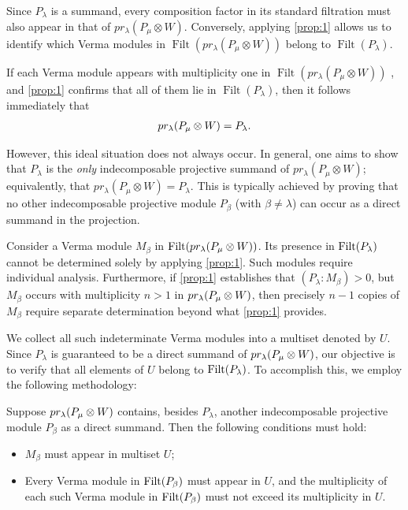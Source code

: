 Since  $P_\lambda$  is a summand, every composition factor in its standard filtration must also appear in that of $pr_\lambda(P_\mu \otimes W)$. Conversely, applying \cref{prop:1} allows us to identify which Verma modules in $\operatorname{Filt}(pr_\lambda(P_\mu \otimes W))$ belong to  $\operatorname{Filt}(P_\lambda)$.

If each Verma module appears with multiplicity one in $\operatorname{Filt}(pr_\lambda(P_\mu \otimes W))$ , and \cref{prop:1} confirms that all of them lie in $\operatorname{Filt}(P_\lambda)$, then it follows immediately that
\begin{equation}\notag
  \begin{aligned}
pr_\lambda(P_\mu \otimes W) = P_\lambda.
  \end{aligned}
\end{equation}

However, this ideal situation does not always occur.
In general, one aims to show that $P_\lambda$ is the \emph{only} indecomposable projective summand of $pr_\lambda(P_\mu \otimes W)$; equivalently, that $pr_\lambda(P_\mu \otimes W) = P_\lambda$. This is typically achieved by proving that no other indecomposable projective module $P_\beta$ (with $ \beta \neq \lambda$) can occur as a direct summand in the projection.

Consider a Verma module $M_\beta$ in $\operatorname{Filt}(pr_{\lambda}(P_\mu \otimes W))$. Its presence in $\operatorname{Filt}(P_\lambda)$ cannot be determined solely by applying \cref{prop:1}.
Such modules require individual analysis. Furthermore, if \cref{prop:1} establishes that $(P_\lambda:M_\beta)>0$, but $M_\beta$ occurs with multiplicity $n>1$ in $pr_{\lambda}(P_\mu \otimes W)$, then precisely $n-1$ copies of $M_\beta$ require separate determination beyond what \cref{prop:1} provides.

We collect all such indeterminate Verma modules into a multiset denoted by $U$. Since $P_\lambda$ is guaranteed to be a direct summand of $pr_{\lambda}(P_\mu \otimes W)$, our objective is to verify that all elements of $U$ belong to $\operatorname{Filt}(P_\lambda)$. To accomplish this, we employ the following methodology:

Suppose $pr_{\lambda}(P_\mu \otimes W)$ contains, besides $P_\lambda$, another indecomposable projective module $P_\beta$ as a direct summand. Then the following conditions must hold:

\begin{itemize}
    \item $M_\beta$ must appear in multiset $U$; 
    \item Every Verma module in $\operatorname{Filt}(P_\beta)$  must appear in $U$, and the multiplicity of each such Verma module in $\operatorname{Filt}(P_\beta) $ must not exceed its multiplicity in $U$.
\end{itemize}

